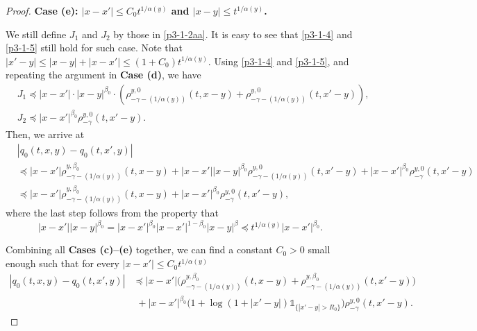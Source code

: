\documentclass[a4paper,11pt]{amsart}
\renewcommand{\le}{\leqslant}
\newcommand{\B}{\beta}
\newcommand{\I}{\mathds 1}
\newcommand{\p}{\preceq}
\newcommand{\A}{\alpha}
\theoremstyle{definition}
\begin{document}
\begin{proof}
{\bf Case (e): $|x-x'|\le C_0t^{{1/\A(y)}}$ and $|x-y|\le t^{{1/\A(y)}}$.}

We still define $J_1$ and $J_2$ by those in \eqref{p3-1-2aa}. It is
easy to see that \eqref{p3-1-4} and \eqref{p3-1-5} still hold for
such case. Note that $|x'-y|\le |x-y|+|x-x'|\le
(1+C_0)t^{{1/\A(y)}}$. Using \eqref{p3-1-4} and
\eqref{p3-1-5}, and repeating the argument in {\bf Case (d)}, we
have
\begin{align*}
& J_1 \p |x-x'|\cdot |x-y|^{\B_0}\cdot
\left(\rho^{y,0}_{-\gamma-({1/\A(y)})}(t,x-y)+\rho^{y,0}_{-\gamma-({1/\A(y)})}(t,x'-y)\right),\\
& J_2  \p |x-x'|^{\B_0}\rho_{-\gamma}^{y,0}(t,x'-y).
\end{align*}
Then, we arrive at
\begin{align*}
&|q_0(t,x,y)-q_0(t,x',y)|\\
&\p|x-x'|\rho^{y,\B_0}_{-\gamma-({1/\A(y)})}(t,x-y)+|x-x'||x-y|^{\B_0}\rho^{y,0}_{-\gamma-({1/\A(y)})}(t,x'-y) +|x-x'|^{\B_0}\rho_{-\gamma}^{y,0}(t,x'-y)\\
&\p|x-x'|\rho^{y,\B_0}_{-\gamma-({1/\A(y)})}(t,x-y)+|x-x'|^{\B_0}\rho_{-\gamma}^{y,0}(t,x'-y),
\end{align*}
where the last step follows from the property that
\begin{equation*}
|x-x'||x-y|^{\B_0}=|x-x'|^{\B_0}|x-x'|^{1-\B_0}|x-y|^{\B}\p t^{{1/\A(y)}}|x-x'|^{\B_0}.
\end{equation*}

Combining all {\bf Cases (c)--(e)} together, we can find a constant $C_0>0$ small enough such that for every $|x-x'|\le C_0t^{{1/\A(y)}}$
\begin{align*}
 |q_0(t,x,y)-q_0(t,x',y)|
 &\p |x-x'|\big(
\rho^{y,\B_0}_{-\gamma-({1/\A(y)})}(t,x-y)
+\rho^{y,\B_0}_{-\gamma-({1/\A(y)})}(t,x'-y)\big)\\
&\,\,+|x-x'|^{\B_0}\big(1+\log(1+|x'-y|)\I_{\{|x'-y|>R_0\}}\big)\rho^{y,0}_{-\gamma}(t,x'-y).
\end{align*}


\end{proof}
\end{document}
